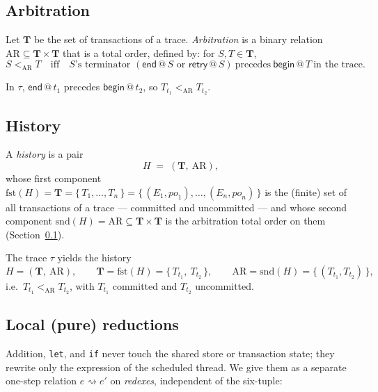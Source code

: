 \documentclass[manuscript,nonacm]{acmart}
\theoremstyle{acmdefinition}
\newcommand{\bbegin}{\textsf{begin}}
\newcommand{\eend}{\textsf{end}}
\newcommand{\retry}{\textsf{retry}}
\newcommand{\po}{\mathit{po}}
\newcommand{\fst}{\mathrm{fst}}             %
\newcommand{\snd}{\mathrm{snd}}             %
\newcommand{\code}[1]{\lstinline[basicstyle=\ttfamily]{#1}}
\begin{document}
\subsection{Arbitration}
\label{subsec:arbitration}
\begin{definition}
Let $\mathbf{T}$ be the set of transactions of a trace. \emph{Arbitration} is a
binary relation $\mathrm{AR} \subseteq \mathbf{T} \times \mathbf{T}$ that is a total
order, defined by: for $S, T \in \mathbf{T}$,
\[
S <_{\mathrm{AR}} T \quad\text{iff}\quad S\text{'s terminator }
(\eend\,@\,S \text{ or } \retry\,@\,S)\ \text{precedes}\ \bbegin\,@\,T\ \text{in the trace.}
\]
\end{definition}

\begin{example}
In $\tau$, $\eend\,@\,t_1$ precedes $\bbegin\,@\,t_2$, so $T_{t_1} <_{\mathrm{AR}} T_{t_2}$.
\end{example}

\subsection{History}
\begin{definition}[History]
A \emph{history} is a pair
\[
H \;=\; (\mathbf{T},\ \mathrm{AR}),
\]
whose first component $\fst(H) = \mathbf{T} = \{\, T_1, \dots, T_n \,\} = \{\, (E_1,\po_1), \dots, (E_n,\po_n) \,\}$
is the (finite) set of all transactions of a trace --- committed and uncommitted ---
and whose second component $\snd(H) = \mathrm{AR} \subseteq \mathbf{T} \times \mathbf{T}$
is the arbitration total order on them (Section~\ref{subsec:arbitration}).
\end{definition}

\begin{example}
The trace $\tau$ yields the history
\[
H = (\mathbf{T},\ \mathrm{AR}), \qquad
\mathbf{T} = \fst(H) = \{\, T_{t_1},\ T_{t_2} \,\}, \qquad
\mathrm{AR} = \snd(H) = \{\, (T_{t_1}, T_{t_2}) \,\},
\]
i.e.\ $T_{t_1} <_{\mathrm{AR}} T_{t_2}$, with $T_{t_1}$ committed and $T_{t_2}$
uncommitted.
\end{example}


\subsection{Local (pure) reductions}
\label{subsec:local}
Addition, \code{let}, and \code{if} never touch the shared store or
transaction state; they rewrite only the expression of the scheduled
thread. We give them as a separate one-step relation
\(e \rightsquigarrow e'\) on \emph{redexes}, independent of the
six-tuple:
\end{document}
